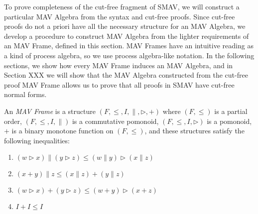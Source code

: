 To prove completeness of the cut-free fragment of SMAV, we will
construct a particular MAV Algebra from the syntax and cut-free
proofs. Since cut-free proofs do not a priori have all the necessary
structure for an MAV Algebra, we develop a procedure to construct MAV
Algebra from the lighter requirements of an MAV Frame, defined in this
section. MAV Frames have an intuitive reading as a kind of process
algebra, so we use process algebra-like notation. In the following
sections, we show how every MAV Frame induces an MAV Algebra, and in
Section XXX we will show that the MAV Algebra constructed from the
cut-free proof MAV Frame allows us to prove that all proofs in SMAV
have cut-free normal forms.

\begin{definition}
  An \emph{MAV Frame} is a structure
  $(F, \leq, I, \parallel, \rhd, +)$ where $(F, \leq)$ is a partial
  order, $(F, \leq, I, \parallel)$ is a commutative pomonoid,
  $(F, \leq, I, \rhd)$ is a pomonoid, $+$ is a binary monotone
  function on $(F, \leq)$, and these structures satisfy the following
  inequalities:
  \begin{enumerate}
  \item $(w \rhd x) \parallel (y \rhd z) \leq (w \parallel y) \rhd (x \parallel z)$
  \item $(x + y) \parallel z \leq (x \parallel z) + (y \parallel z)$
  \item $(w \rhd x) + (y \rhd z) \leq (w + y) \rhd (x + z)$
  \item $I + I \leq I$
  \end{enumerate}
\end{definition}

\begin{remark}
\end{remark}

\begin{remark}
\end{remark}

\begin{proposition}
\end{proposition}

